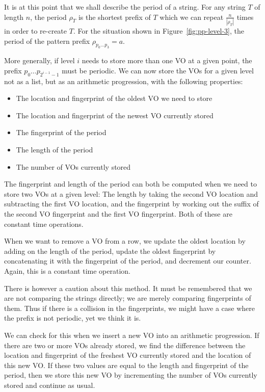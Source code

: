 \documentclass[ %
                    author={Dominic Joseph Moylett},
                    degree={MEng},
                     title={Dictionary Matching with Fingerprints},
                  subtitle={An Empirical Analysis},
                      type={research},
                      year={2015} ]{dissertation}
\begin{document}
It is at this point that we shall describe the period of a string. For any string $T$ of length $n$, the period $\rho_T$ is the shortest prefix of $T$ which we can repeat $\frac{n}{|\rho_T|}$ times in order to re-create $T$. For the situation shown in Figure~\ref{fig:pp-level-3}, the period of the pattern prefix $\rho_{p_0...p_3} = a$.

More generally, if level $i$ needs to store more than one VO at a given point, the prefix $p_0...p_{2^{i-1} - 1}$ must be periodic. We can now store the VOs for a given level not as a list, but as an arithmetic progression, with the following properties:

\begin{itemize}
  \item The location and fingerprint of the oldest VO we need to store
  \item The location and fingerprint of the newest VO currently stored
  \item The fingerprint of the period
  \item The length of the period
  \item The number of VOs currently stored
\end{itemize}

The fingerprint and length of the period can both be computed when we need to store two VOs at a given level: The length by taking the second VO location and subtracting the first VO location, and the fingerprint by working out the suffix of the second VO fingerprint and the first VO fingerprint. Both of these are constant time operations.

When we want to remove a VO from a row, we update the oldest location by adding on the length of the period, update the oldest fingerprint by concatenating it with the fingerprint of the period, and decrement our counter. Again, this is a constant time operation.

There is however a caution about this method. It must be remembered that we are not comparing the strings directly; we are merely comparing fingerprints of them. Thus if there is a collision in the fingerprints, we might have a case where the prefix is not periodic, yet we think it is.

We can check for this when we insert a new VO into an arithmetic progression. If there are two or more VOs already stored, we find the difference between the location and fingerprint of the freshest VO currently stored and the location of this new VO. If these two values are equal to the length and fingerprint of the period, then we store this new VO by incrementing the number of VOs currently stored and continue as usual.
\end{document}
